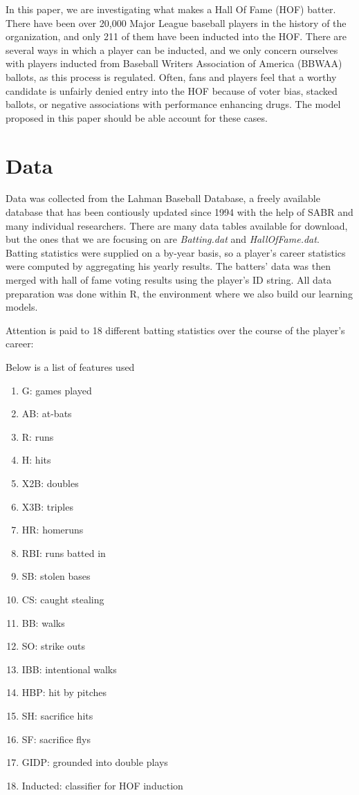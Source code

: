 \documentclass[preprint,12pt]{elsarticle}
\begin{document}
In this paper, we are investigating what makes a Hall Of Fame (HOF) batter. There have been over 20,000 Major League baseball players in the history of the organization, and only 211 of them have been inducted into the HOF. There are several ways in which a player can be inducted, and we only concern ourselves with players inducted from Baseball Writers Association of America (BBWAA) ballots, as this process is regulated. Often, fans and players feel that a worthy candidate is unfairly denied entry into the HOF because of voter bias, stacked ballots, or negative associations with performance enhancing drugs. The model proposed in this paper should be able account for these cases.

\section{Data}
\label{S:2}
Data was collected from the Lahman Baseball Database, a freely available database that has been contiously updated since 1994 with the help of SABR and many individual researchers. There are many data tables available for download, but the ones that we are focusing on are \textit{Batting.dat} and \textit{HallOfFame.dat}. Batting statistics were supplied on a by-year basis, so a player's career statistics were computed by aggregating his yearly results. The batters' data was then merged with hall of fame voting results using the player's ID string. All data preparation was done within R, the environment where we also build our learning models. 

Attention is paid to 18 different batting statistics over the course of the player's career:

Below is a list of features used 
\begin{enumerate}
	\item G: games played
	\item AB: at-bats
	\item R: runs
	\item H: hits
	\item X2B: doubles
	\item X3B: triples
	\item HR: homeruns
	\item RBI: runs batted in
	\item SB: stolen bases
	\item CS: caught stealing
	\item BB: walks
	\item SO: strike outs
	\item IBB: intentional walks
	\item HBP: hit by pitches
	\item SH: sacrifice hits
	\item SF: sacrifice flys
	\item GIDP: grounded into double plays
	\item Inducted: classifier for HOF induction
\end{enumerate}
\end{document}
